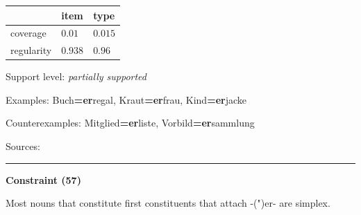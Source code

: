 \vspace{-0.25em}

\begin{table}[!ht]
\begin{center}
\setlength{\extrarowheight}{1pt}
\begin{tabularx}{\columnwidth}{|X|X|X|}
\hline
 & item & type \\
\hline
 coverage & $0.01$ & $0.015$ \\
\hline
 regularity & $0.938$ & $0.96$ \\
\hline
\end{tabularx}
\end{center}
\end{table}

\vspace{-1.35em}

\noindent
Support level: \textit{partially supported}

\vspace{0.3em}

\noindent
Examples: Buch\textbf{=er}regal, Kraut\textbf{=er}frau, Kind\textbf{=er}jacke

\noindent
Counterexamples: Mitglied\textbf{=er}liste, Vorbild\textbf{=er}sammlung

\vspace{0.3em}

\noindent
Sources: \citet[9, 11]{kuerschner_2010}

\vspace{0.35em}
\hrule




\vspace{0.4em}

\begin{center}
\textbf{Constraint (57)}
\end{center}

\noindent
Most nouns that constitute first constituents that attach -(")er- are simplex.
\vspace{0.5em}


